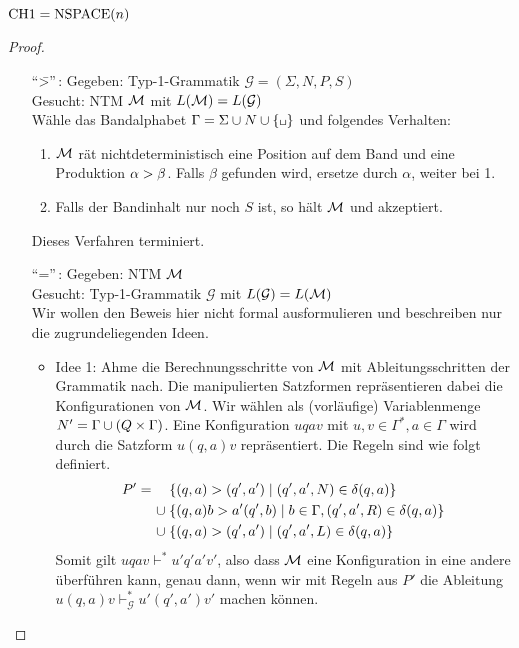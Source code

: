 {\begin{Satz}\label{satz:6.3}
	$\text{CH{1}}=\operatorname{NSPACE}(n)$
\end{Satz}
\begin{proof}\
\begin{itemize}
	\item["`\=>"'\,:]
		Gegeben: Typ-1-Grammatik $\mathcal{G}=(\Sigma,N,P,S)$ \\
		Gesucht: \ac{NTM} $\mathcal{M}$ mit $L(\mathcal{M}) = L(\mathcal{G})$ \\
		Wähle das Bandalphabet $\Gamma = \Sigma\cup N\cup\{\blank\}$ und folgendes Verhalten:
		\begin{enumerate}
		\item $\mathcal{M}$ rät nichtdeterministisch eine Position auf
                  dem Band und eine Produktion $\alpha\-> \beta$. Falls $\beta$ gefunden wird, ersetze durch $\alpha$, weiter bei 1.
		\item Falls der Bandinhalt nur noch $S$ ist, so hält $\mathcal{M}$ und akzeptiert.
		\end{enumerate}
		Dieses Verfahren terminiert.
	\item["`\<="'\,:] %
	Gegeben: \ac{NTM} $\mathcal{M}$ \\
	Gesucht: Typ-1-Grammatik $\mathcal{G}$ mit $L(\mathcal{G})=L(\mathcal{M})$\\
	Wir wollen den Beweis hier nicht formal ausformulieren und beschreiben nur die zugrundeliegenden Ideen.
	\begin{itemize}
	\item Idee 1:
	Ahme die Berechnungsschritte von $\mathcal{M}$ mit Ableitungsschritten der Grammatik nach.
	Die manipulierten Satzformen repräsentieren dabei die Konfigurationen von $\mathcal{M}$.
	Wir wählen als (vorläufige) Variablenmenge $N'=\Gamma\cup(Q\times\Gamma)$.
	Eine Konfiguration $uqav$ mit $u,v\in\Gamma^*,a\in\Gamma$ wird durch die Satzform $u(q,a)v$ repräsentiert.
	Die Regeln sind wie folgt definiert.
	\begin{align*}
	 P' = \quad &\; \{ (q,a) \-> (q',a') \mid (q',a',N)\in \delta(q,a)\}\\
	 \cup &\; \{ (q,a)b \-> a'(q',b) \mid b\in\Gamma, (q',a',R)\in \delta(q,a) \}\\
	 \cup &\; \{ (q,a) \-> (q',a') \mid (q',a',L)\in \delta(q,a)\}
	\end{align*}
    Somit gilt $uqav \vdash^{*} u'q'a'v'$, also dass $\mathcal{M}$ eine Konfiguration in eine andere überführen kann, genau dann,
    wenn wir mit Regeln aus $P'$ die Ableitung $u(q,a)v \vdash_\mathcal{G}^{*} u'(q',a')v'$ machen können.


\end{itemize}
\end{itemize}
\end{proof}}
